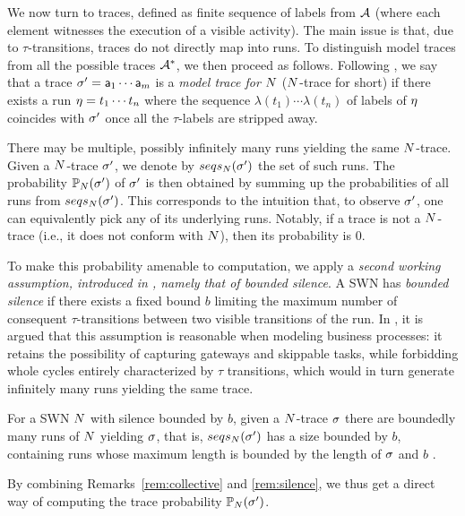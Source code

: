 We now turn to traces, defined as finite sequence of labels from $\mathcal{A}$ (where each element witnesses the execution of a visible activity). The main issue is that, due to $\tau$-transitions, traces do not directly map into runs. To distinguish model traces from all the possible traces $\mathcal{A}^*$, we then proceed as follows. Following \cite{DBLP:conf/edoc/AdriansyahDA11,LeoniM17},  we say that a trace ${\sigma'}=\mathsf{a}_1\cdots \mathsf{a}_m$ is a \emph{model trace for $N$} ($N$-trace for short) if there exists a run $\eta = t_1\cdots t_n$ where the sequence $\lambda(t_1)\cdots \lambda(t_n)$ of labels of $\eta$ coincides with ${\sigma'}$ once all the $\tau$-labels are stripped away.

There may be multiple, possibly infinitely many runs yielding the same $N$-trace. Given a $N$-trace ${\sigma'}$, we denote by $seqs_{N}({\sigma'})$ the set of such runs. The probability $\mathbb{P}_{N}({\sigma'})$ of ${\sigma'}$ is then obtained by summing up the probabilities of all runs from $seqs_{N}({\sigma'})$.
This corresponds to the intuition that, to observe ${\sigma'}$, one can equivalently pick any of its underlying runs. Notably, if a trace is not a $N$-trace (i.e., it does not conform with $N$), then its probability is 0. 

To make this probability amenable to computation, we apply a \emph{second working assumption, introduced in \cite{Bergami21}, namely that of bounded silence}. A SWN has \emph{bounded silence} if there exists a fixed bound $b$ limiting the maximum number of consequent $\tau$-transitions between two visible transitions of the run. In \cite{Bergami21}, it is argued that this assumption is reasonable when modeling business processes: it retains the possibility of capturing gateways and skippable tasks, while forbidding whole cycles entirely characterized by $\tau$ transitions, which would in turn generate infinitely many runs yielding the same trace. 

\begin{remark}
\label{rem:silence}
	For a SWN $N$ with silence bounded by $b$, given a $N$-trace $\sigma$ there are boundedly many runs of $N$ yielding $\sigma$, that is, $seqs_{N}({\sigma'})$ has a size bounded by $b$, containing runs whose maximum length is bounded by the length of $\sigma$ and $b$ \cite{Bergami21}.
\end{remark}

By combining Remarks~\ref{rem:collective} and \ref{rem:silence}, we thus get a direct way of computing the trace probability $\mathbb{P}_{N}({\sigma'})$.

